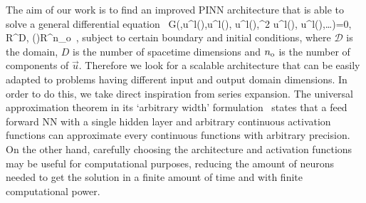 \documentclass{article}
\begin{document}
The aim of our work is to find an improved PINN architecture that is able to solve a general differential equation~\cite{Lagaris:1997ap}
\beq
G(,u^{l}(),\nabla u^{l}(), u^{l}(),\nabla^2 u^{l}(), u^{l}(),\dots)=0\;,\qquad {}\in {} \subset \Bbb R^{D}\;, \qquad  {}()\in \Bbb R^{n_{\rm o}} \,,
\label{eq:PDE}
\eeq
subject to certain boundary and initial conditions, where $\mathcal{D}$ is the domain, $D$ is the number of spacetime dimensions and $n_{\rm o}$ is the number of components of $\vec{u}$. Therefore we look for a scalable architecture that can be easily adapted to problems having different input and output domain dimensions. In order to do this, we take direct inspiration from series expansion. The universal approximation theorem in its ‘arbitrary width’ formulation~\cite{cybenko1989approximation, HORNIK1991251, pinkus_1999} states that a feed forward NN with a single hidden layer and arbitrary continuous activation functions can approximate every continuous functions with arbitrary precision. On the other hand, carefully choosing the architecture and activation functions may be useful for computational purposes, reducing the amount of neurons needed to get the solution in a finite amount of time and with finite computational power.
\end{document}

